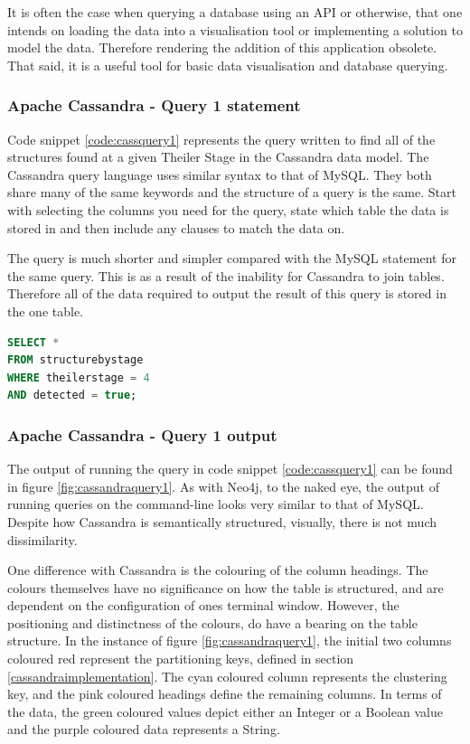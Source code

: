 It is often the case when querying a database using an API or otherwise, that one intends on loading the data into a visualisation tool or implementing a solution to model the data. Therefore rendering the addition of this application obsolete. That said, it is a useful tool for basic data visualisation and database querying.

\subsubsection*{Apache Cassandra - Query 1 statement}\label{cassquery1statement}
Code snippet \ref{code:cassquery1} represents the query written to find all of the structures found at a given Theiler Stage in the Cassandra data model. The Cassandra query language uses similar syntax to that of MySQL. They both share many of the same keywords and the structure of a query is the same. Start with selecting the columns you need for the query, state which table the data is stored in and then include any clauses to match the data on.

The query is much shorter and simpler compared with the MySQL statement for the same query. This is as a result of the inability for Cassandra to join tables. Therefore all of the data required to output the result of this query is stored in the one table.

\begin{lstlisting}[language=SQL, caption=Cassandra query 1 statement. All structures at Theiler Stage X., label=code:cassquery1]
SELECT *
FROM structurebystage
WHERE theilerstage = 4
AND detected = true;
\end{lstlisting}

\subsubsection*{Apache Cassandra - Query 1 output}\label{cassquery1output}
The output of running the query in code snippet \ref{code:cassquery1} can be found in figure \ref{fig:cassandraquery1}. As with Neo4j, to the naked eye, the output of running queries on the command-line looks very similar to that of MySQL. Despite how Cassandra is semantically structured, visually, there is not much dissimilarity.

One difference with Cassandra is the colouring of the column headings. The colours themselves have no significance on how the table is structured, and are dependent on the configuration of ones terminal window. However, the positioning and distinctness of the colours, do have a bearing on the table structure. In the instance of figure \ref{fig:cassandraquery1}, the initial two columns coloured red represent the partitioning keys, defined in section \ref{cassandraimplementation}. The cyan coloured column represents the clustering key, and the pink coloured headings define the remaining columns. In terms of the data, the green coloured values depict either an Integer or a Boolean value and the purple coloured data represents a String.

